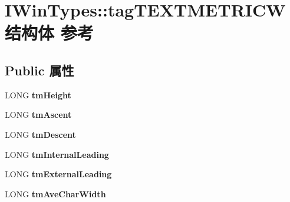 \hypertarget{struct_i_win_types_1_1tag_t_e_x_t_m_e_t_r_i_c_w}{}\section{I\+Win\+Types\+:\+:tag\+T\+E\+X\+T\+M\+E\+T\+R\+I\+C\+W结构体 参考}
\label{struct_i_win_types_1_1tag_t_e_x_t_m_e_t_r_i_c_w}
\subsection*{Public 属性}
\begin{DoxyCompactItemize}
\item 
\mbox{\label{struct_i_win_types_1_1tag_t_e_x_t_m_e_t_r_i_c_w_a52c376039a1cde72cae207b5b14a943d}} 
L\+O\+NG {\bfseries tm\+Height}
\item 
\mbox{\label{struct_i_win_types_1_1tag_t_e_x_t_m_e_t_r_i_c_w_afb87280060930cfea382d03a1fddde3d}} 
L\+O\+NG {\bfseries tm\+Ascent}
\item 
\mbox{\label{struct_i_win_types_1_1tag_t_e_x_t_m_e_t_r_i_c_w_a68ea82aaf54e9515bf02569568c94abc}} 
L\+O\+NG {\bfseries tm\+Descent}
\item 
\mbox{\label{struct_i_win_types_1_1tag_t_e_x_t_m_e_t_r_i_c_w_afeab95533705c87b7c8a739274c00562}} 
L\+O\+NG {\bfseries tm\+Internal\+Leading}
\item 
\mbox{\label{struct_i_win_types_1_1tag_t_e_x_t_m_e_t_r_i_c_w_a92dda34741cf9b34edb4d431ff3e069e}} 
L\+O\+NG {\bfseries tm\+External\+Leading}
\item 
\mbox{\label{struct_i_win_types_1_1tag_t_e_x_t_m_e_t_r_i_c_w_a7aaeaf99d1e8df7bbf855459d9bb21e4}} 
L\+O\+NG {\bfseries tm\+Ave\+Char\+Width}
\item 
\mbox{\label{struct_i_win_types_1_1tag_t_e_x_t_m_e_t_r_i_c_w_a7b518b7b86f49e4976f529db9908a923}} 

\end{DoxyCompactItemize}
